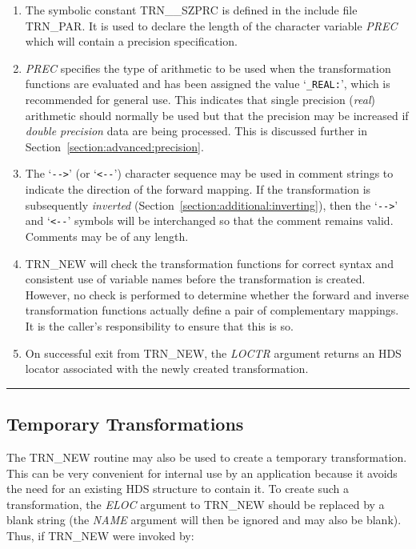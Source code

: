 \documentclass[twoside,11pt]{article}
\newcommand{\xlabel}[1]{}
\newcommand{\name}[1]{\mbox{\small{#1}}}
\newcommand{\fortvar}[1]{\mbox{\emph{#1}}}
\newcommand{\exampledone}[0]{\begin{center} \rule{6em}{0.2mm} \end{center}}
\begin{document}
\begin{enumerate}

\item The symbolic constant \name{TRN\_\_SZPRC} is defined in the include
file \name{TRN\_PAR}. 
It is used to declare the length of the character variable \fortvar{PREC}
which will contain a precision specification. 

\item \fortvar{PREC} specifies the type of arithmetic to be used when the
transformation functions are evaluated and has been assigned the value
`\verb#_REAL:#', which is recommended for general use.
This indicates that single precision (\emph{real}) arithmetic should normally
be used but that the precision may be increased if \emph{double precision}
data are being processed. 
This is discussed further in Section~\ref{section:advanced:precision}. 

\item The `\verb#-->#' (or `\verb#<--#') character sequence may be used in
comment strings to indicate the direction of the forward mapping. 
If the transformation is subsequently \emph{inverted}
(Section~\ref{section:additional:inverting}), then the `\verb#-->#' and
`\verb#<--#' symbols will be interchanged so that the comment remains valid.
Comments may be of any length.

\item \name{TRN\_NEW} will check the transformation functions for correct
syntax and consistent use of variable names before the transformation is
created.
However, no check is performed to determine whether the forward and inverse
transformation functions actually define a pair of complementary mappings. 
It is the caller's responsibility to ensure that this is so.

\item On successful exit from \name{TRN\_NEW}, the \fortvar{LOCTR} argument
returns an \name{HDS} locator associated with the newly created
transformation. 

\end{enumerate}
\exampledone


\subsection{\xlabel{temporary_transformations}Temporary Transformations}

\label{section:simple:temporary}

The \name{TRN\_NEW} routine may also be used to create a temporary
transformation.
This can be very convenient for internal use by an application because it
avoids the need for an existing \name{HDS} structure to contain it. 
To create such a transformation, the \fortvar{ELOC} argument to
\name{TRN\_NEW} should be replaced by a blank string (the \fortvar{NAME}
argument will then be ignored and may also be blank). 
Thus, if \name{TRN\_NEW} were invoked by:
\end{document}
